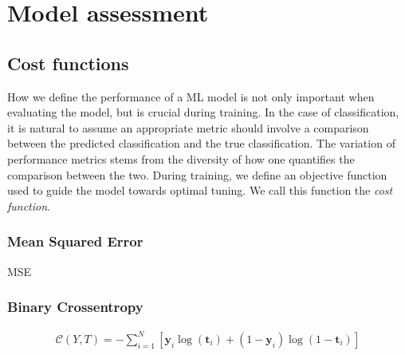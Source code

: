 \section{Model assessment}\label{subsec:Cost}


\subsection{Cost functions}
How we define the performance of a \ac{ML} model is not only important when 
evaluating the model, but is crucial during training. In the case of classification,
it is natural to assume an appropriate metric should involve a comparison between 
the predicted classification and the true classification. The variation of 
performance metrics stems from the diversity of how one quantifies the comparison 
between the two. During training, we define an objective function used to guide 
the model towards optimal tuning. We call this function the \emph{cost function}. 
\\
\subsubsection{Mean Squared Error}\label{subsubsec:MSE}
\ac{MSE}
\subsubsection{Binary Crossentropy}
\begin{align}
    \mathcal{C}\left(Y, T\right) =-\sum_{i=1}^N\left[ \textbf{y}_i \log \left(\textbf{t}_i\right)+\left(1-\textbf{y}_i\right) \log \left(1-\textbf{t}_i\right)\right]
\end{align}

